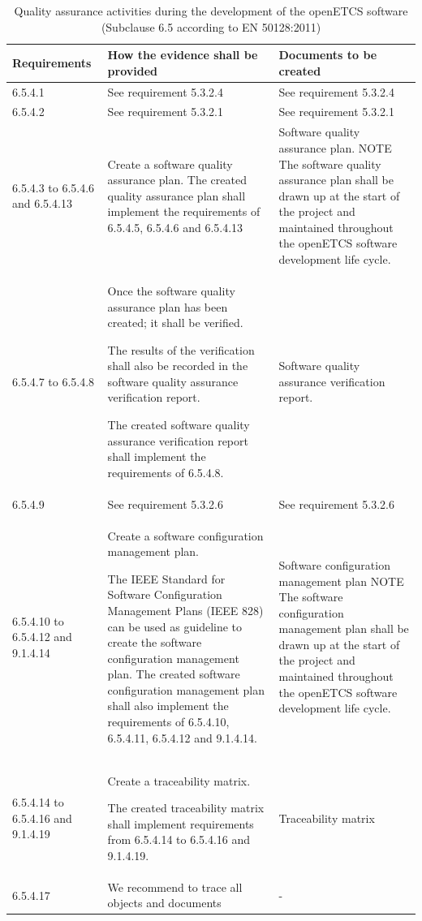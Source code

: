 \documentclass{template/openetcs_report}
\begin{document}
{\footnotesize\sffamily\centering
\begin{longtable}{|p{2cm}|p{9cm}|p{3cm}|}
\caption{Quality assurance activities during the development of the openETCS software (Subclause 6.5 according to EN 50128:2011)}\\
\hline
\bfseries Requirements & \bfseries How the evidence shall be provided & \bfseries Documents to be created\\
\hline
\hline
\endhead
\hline
\endfoot

6.5.4.1 & See requirement 5.3.2.4 & See requirement 5.3.2.4\\ 
\hline
6.5.4.2 & See requirement 5.3.2.1 & See requirement 5.3.2.1\\ 
\hline
6.5.4.3 to 6.5.4.6 and 6.5.4.13 & Create a software quality assurance plan.
The created quality assurance plan shall implement the requirements of 6.5.4.5, 6.5.4.6 and 6.5.4.13
& Software quality assurance plan.
\linebreak
\linebreak
NOTE\linebreak
The software quality assurance plan shall be drawn up at the start of the project and maintained throughout the openETCS software development life cycle.\\ 
\hline
6.5.4.7 to 6.5.4.8 & Once the software quality assurance plan has been created; it shall be verified.

The results of the verification shall also be recorded in the software quality assurance verification report.

The created software quality assurance verification report shall implement the requirements of 6.5.4.8.
& Software quality assurance verification report.\\ 
\hline
6.5.4.9 & See requirement 5.3.2.6 & See requirement 5.3.2.6\\ 
\hline
6.5.4.10 to 6.5.4.12 and 9.1.4.14 & Create a software configuration management plan.

The IEEE Standard for Software Configuration Management Plans (IEEE 828) can be used as guideline to create the software configuration management plan.
The created software configuration management plan shall also implement the requirements of 6.5.4.10, 6.5.4.11, 6.5.4.12 and 9.1.4.14.
& Software configuration management plan
\linebreak
\linebreak
NOTE\linebreak
The software configuration management plan shall be drawn up at the start of the project and maintained throughout the openETCS software development life cycle.\\ 
\hline
6.5.4.14 to 6.5.4.16 and 9.1.4.19 & Create a traceability matrix.

The created traceability matrix shall implement requirements from 6.5.4.14 to 6.5.4.16 and 9.1.4.19.
& Traceability matrix\\ 
\hline
6.5.4.17 & We recommend to trace all objects and documents & - \\ 
\hline
\end{longtable}}
\end{document}
